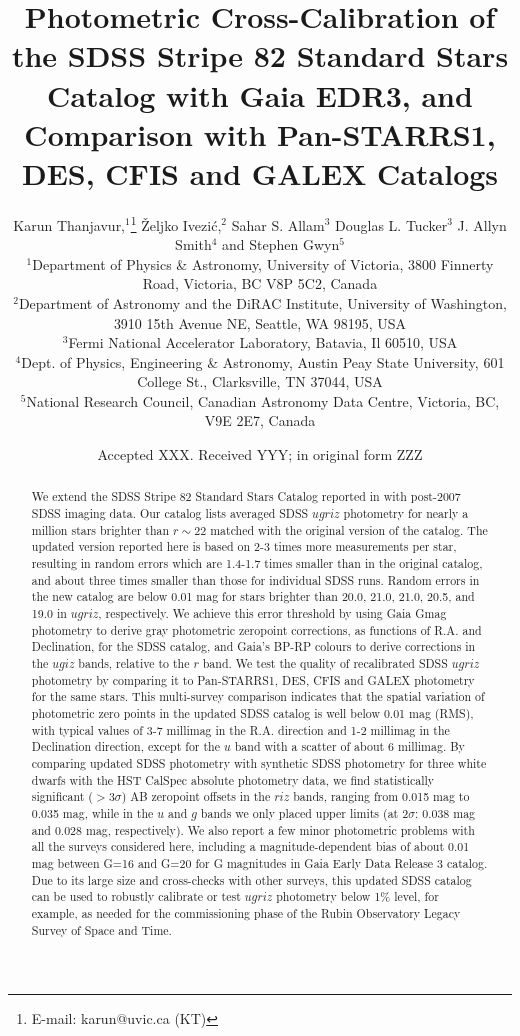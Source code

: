 \documentclass[fleqn,usenatbib]{mnras}
\title[SDSS Stripe 82 Standard Stars Catalog: New and Improved]{Photometric Cross-Calibration
of the SDSS Stripe 82 Standard Stars Catalog with Gaia EDR3, and Comparison with Pan-STARRS1, DES, 
CFIS and GALEX Catalogs}
\author[K. Thanjavur et al.]{
Karun Thanjavur,$^{1}$\thanks{E-mail: karun@uvic.ca (KT)}
\v{Z}eljko Ivezi\'{c},$^{2}$
Sahar S. Allam$^{3}$
Douglas L. Tucker$^{3}$
J. Allyn Smith$^{4}$
and Stephen Gwyn$^{5}$
\\
$^{1}$Department of Physics \& Astronomy, University of Victoria, 3800 Finnerty Road, Victoria, BC V8P 5C2, Canada\\
$^{2}$Department of Astronomy and the DiRAC Institute, University of Washington, 3910 15th Avenue NE, Seattle, WA 98195, USA\\
$^{3}$Fermi National Accelerator Laboratory, Batavia, Il 60510, USA\\
$^{4}$Dept. of Physics, Engineering \& Astronomy, Austin Peay State University, 601 College St., Clarksville, TN 37044, USA\\
$^{5}$National Research Council, Canadian Astronomy Data Centre, Victoria, BC, V9E 2E7, Canada
}
\date{Accepted XXX. Received YYY; in original form ZZZ}
\begin{document}
\label{firstpage}
\pagerange{\pageref{firstpage}--\pageref{lastpage}}
\maketitle

\begin{abstract}
We extend the SDSS Stripe 82 Standard Stars Catalog reported in \citet{Ivez07} with
post-2007 SDSS imaging data. Our catalog lists averaged SDSS $ugriz$ photometry
for nearly a million stars brighter than $r\sim22$ matched with the original version of the catalog. 
The updated version reported here is based on 2-3 times more measurements per star, resulting 
in random errors which are 1.4-1.7 times smaller than in the original catalog, and about three 
times smaller than those for individual SDSS runs. Random errors in the new catalog are below 
0.01 mag for stars brighter than 20.0, 21.0, 21.0, 20.5, and 19.0 in $ugriz$, respectively. 
We achieve this error threshold by using Gaia Gmag photometry to derive gray photometric 
zeropoint corrections, as functions of R.A. and Declination, for the SDSS catalog, and Gaia's 
BP-RP colours to derive corrections in the $ugiz$ bands, relative to the $r$ band. We test the 
quality of recalibrated SDSS $ugriz$ photometry by comparing it to Pan-STARRS1, DES, CFIS 
and GALEX photometry for the same stars. This multi-survey 
comparison indicates that the spatial variation of photometric zero points in the updated SDSS 
catalog is well below 0.01 mag (RMS), with typical values of 3-7 millimag in the R.A. direction and 
1-2 millimag in the Declination direction, except for the $u$ band with a scatter of about 6 millimag.
By comparing updated SDSS photometry with synthetic SDSS photometry for three white dwarfs
with the HST CalSpec absolute photometry data, we find statistically significant ($>3\sigma$) 
AB zeropoint offsets in the $riz$ bands, ranging from 0.015 mag to 0.035 mag, while in the $u$ 
and $g$ bands we only placed upper limits (at $2\sigma$: 0.038 mag and 0.028 mag, respectively).  
We also report a few minor photometric problems with all the surveys considered here, including 
a magnitude-dependent bias of about 0.01 mag between G=16 and G=20 for G magnitudes in Gaia 
Early Data Release 3 catalog. Due to its large size and cross-checks with other surveys, this updated 
SDSS catalog can be used to robustly calibrate or test $ugriz$ photometry below 1\% level, for example, 
as needed for the commissioning phase of the Rubin Observatory Legacy Survey of Space and Time. 
\end{abstract}
\end{document}
